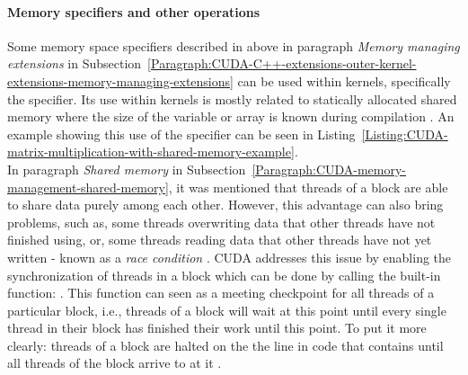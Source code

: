 \paragraph{Memory specifiers and other operations}
Some memory space specifiers described in above in paragraph \textit{Memory managing extensions} in Subsection~\ref{Paragraph:CUDA-C++-extensions-outer-kernel-extensions-memory-managing-extensions} can be used within kernels, specifically the  specifier. Its use within kernels is mostly related to statically allocated shared memory where the size of the variable or array is known during compilation \cite{NVIDIAMay2022}. An example showing this use of the specifier can be seen in Listing~\ref{Listing:CUDA-matrix-multiplication-with-shared-memory-example}. \\
In paragraph \textit{Shared memory} in Subsection~\ref{Paragraph:CUDA-memory-management-shared-memory}, it was mentioned that threads of a block are able to share data purely among each other. However, this advantage can also bring problems, such as, some threads overwriting data that other threads have not finished using, or, some threads reading data that other threads have not yet written - known as a \textit{race condition} \cite{Harris28January2013}. CUDA addresses this issue by enabling the synchronization of threads in a block which can be done by calling the built-in function: . This function can seen as a meeting checkpoint for all threads of a particular block, i.e., threads of a block will wait at this point until every single thread in their block has finished their work until this point. To put it more clearly: threads of a block are halted on the the line in code that contains  until all threads of the block arrive to at it \cite{NVIDIAMay2022}.


